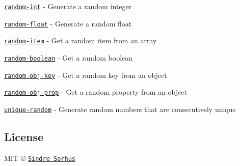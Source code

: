 \begin{DoxyItemize}
\item \href{https://github.com/sindresorhus/random-int}{\tt random-\/int} -\/ Generate a random integer
\item \href{https://github.com/sindresorhus/random-float}{\tt random-\/float} -\/ Generate a random float
\item \href{https://github.com/sindresorhus/random-item}{\tt random-\/item} -\/ Get a random item from an array
\item \href{https://github.com/arthurvr/random-boolean}{\tt random-\/boolean} -\/ Get a random boolean
\item \href{https://github.com/sindresorhus/random-obj-key}{\tt random-\/obj-\/key} -\/ Get a random key from an object
\item \href{https://github.com/sindresorhus/random-obj-prop}{\tt random-\/obj-\/prop} -\/ Get a random property from an object
\item \href{https://github.com/sindresorhus/unique-random}{\tt unique-\/random} -\/ Generate random numbers that are consecutively unique
\end{DoxyItemize}

\subsection*{License}

M\+IT © \href{https://sindresorhus.com}{\tt Sindre Sorhus} 